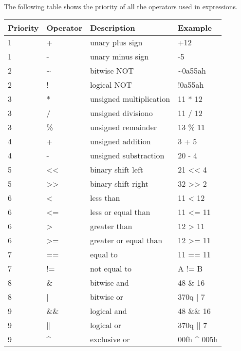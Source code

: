     The following table shows the priority of all the operators used in expressions.

    \begin{table}[h!]
        \centering{}
        \mysmallfont{}

        \begin{tabular}{|l|l|l|l|}
            \hline
            Priority & Operator & Description             & Example         \\\hline
            1        & +        & unary plus sign         & +12             \\\hline
            1        & -        & unary minus sign        & -5              \\\hline
            2        & \~{}     & bitwise NOT             & \~{}0a55ah      \\\hline
            2        & !        & logical NOT             & !0a55ah         \\\hline
            3        & *        & unsigned multiplication & 11 * 12         \\\hline
            3        & /        & unsigned divisiono      & 11 / 12         \\\hline
            3        & \%       & unsigned remainder      & 13 \% 11        \\\hline
            4        & +        & unsigned addition       & 3 + 5           \\\hline
            4        & -        & unsigned substraction   & 20 - 4          \\\hline
            5        & <{}<     & binary shift left       & 21 << 4         \\\hline
            5        & >{}>     & binary shift right      & 32 >> 2         \\\hline
            6        & <        & less than               & 11 < 12         \\\hline
            6        & <=       & less or equal than      & 11 <= 11        \\\hline
            6        &  >       & greater than            & 12 > 11         \\\hline
            6        & >=       & greater or equal than   & 12 >= 11        \\\hline
            7        & ==       & equal to                & 11 == 11        \\\hline
            7        & !=       & not equal to            &  A != B         \\\hline
            8        & \&       & bitwise and             & 48 \& 16        \\\hline
            8        & |        & bitwise or              & 370q | 7        \\\hline
            9        & \&\&     & logical and             & 48 \&\& 16      \\\hline
            9        & ||       & logical or              & 370q || 7       \\\hline
            9        & \^{}     & exclusive or            & 00fh \^{} 005h  \\\hline
        \end{tabular}


\end{table}
